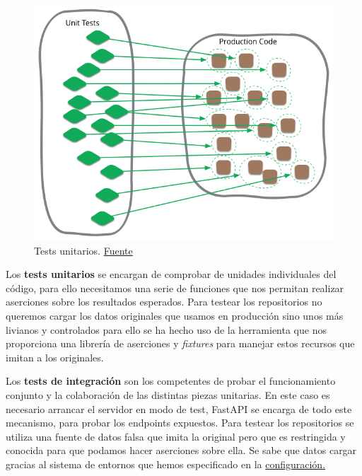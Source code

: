 \vskip 0.4in

\FloatBarrier
\begin{figure}[h]
	\centering	
	\includegraphics[width=\textwidth]{doc/logos/imgs/unit-test.png}
    \caption{ Tests unitarios.
    \href{https://martinfowler.com/bliki/images/unitTest/sketch.png}{Fuente}}
    \label{fig:unit-tests}
\end{figure}
\FloatBarrier

Los \textbf{tests unitarios} se encargan de comprobar de unidades individuales del código,
para ello necesitamos una serie de funciones que nos permitan realizar aserciones sobre
los resultados esperados. Para testear los repositorios no queremos cargar los
datos originales que usamos en producción sino unos más livianos y controlados para ello
se ha hecho uso de la herramienta  que nos proporciona una librería de
aserciones y \textit{fixtures} para manejar estos recursos que imitan a los originales.

Los \textbf{tests de integración} son los competentes de probar el funcionamiento conjunto
y la colaboración de las distintas piezas unitarias. En este caso es necesario arrancar el servidor en
modo de test, FastAPI se encarga de todo este mecanismo, para probar los endpoints
expuestos. Para testear los repositorios se utiliza una fuente de datos falsa que imita la
original pero que es restringida y conocida para que podamos hacer aserciones sobre ella. Se 
sabe que datos cargar gracias al sistema de entornos que hemos especificado en la \hyperref[sec:config]{configuración.}

